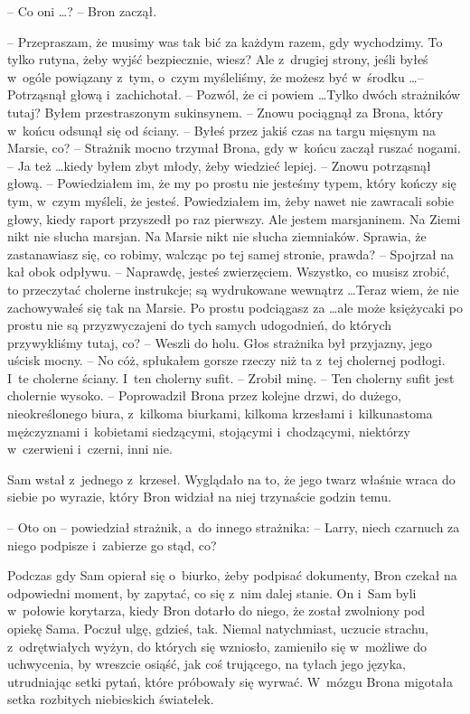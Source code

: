 \documentclass[oneside,polish,11pt,rmheadings]{mwbk}
\begin{document}
-- Co oni \ldots ? -- Bron zaczął. 

-- Przepraszam, że musimy was tak bić za każdym razem, gdy wychodzimy. To tylko rutyna, żeby wyjść bezpiecznie, wiesz? Ale z~drugiej strony, jeśli byłeś w~ogóle powiązany z~tym, o~czym myśleliśmy, że możesz być w~środku \ldots  -- Potrząsnął głową i~zachichotał. -- Pozwól, że ci powiem  \ldots  Tylko dwóch strażników tutaj? Byłem przestraszonym sukinsynem. -- Znowu pociągnął za Brona, który w~końcu odsunął się od ściany. -- Byłeś przez jakiś czas na targu mięsnym na Marsie, co? -- Strażnik mocno trzymał Brona, gdy w~końcu zaczął ruszać nogami. -- Ja też \ldots  kiedy byłem zbyt młody, żeby wiedzieć lepiej. -- Znowu potrząsnął głową. -- Powiedziałem im, że my po prostu nie jesteśmy typem, który kończy się tym, w~czym myśleli, że jesteś. Powiedziałem im, żeby nawet nie zawracali sobie głowy, kiedy raport przyszedł po raz pierwszy. Ale jestem marsjaninem. Na Ziemi nikt nie słucha marsjan. Na Marsie nikt nie słucha ziemniaków. Sprawia, że zastanawiasz się, co robimy, walcząc po tej samej stronie, prawda? -- Spojrzał na kał obok odpływu. -- Naprawdę, jesteś zwierzęciem. Wszystko, co musisz zrobić, to przeczytać cholerne instrukcje; są wydrukowane wewnątrz \ldots  Teraz wiem, że nie zachowywałeś się tak na Marsie. Po prostu podciągasz za \ldots  ale może księżycaki po prostu nie są przyzwyczajeni do tych samych udogodnień, do których przywykliśmy tutaj, co? -- Weszli do holu. Głos strażnika był przyjazny, jego uścisk mocny. -- No cóż, spłukałem gorsze rzeczy niż ta z~tej cholernej podłogi. I~te cholerne ściany. I~ten cholerny sufit. -- Zrobił minę. -- Ten cholerny sufit jest cholernie wysoko. -- Poprowadził Brona przez kolejne drzwi, do dużego, nieokreślonego biura, z~kilkoma biurkami, kilkoma krzesłami i~kilkunastoma mężczyznami i~kobietami siedzącymi, stojącymi i~chodzącymi, niektórzy w~czerwieni i~czerni, inni nie. 

Sam wstał z~jednego z~krzeseł. Wyglądało na to, że jego twarz właśnie wraca do siebie po wyrazie, który Bron widział na niej trzynaście godzin temu. 

-- Oto on -- powiedział strażnik, a~do innego strażnika: -- Larry, niech czarnuch za niego podpisze i~zabierze go stąd, co? 

Podczas gdy Sam opierał się o~biurko, żeby podpisać dokumenty, Bron czekał na odpowiedni moment, by zapytać, co się z~nim dalej stanie. On i~Sam byli w~połowie korytarza, kiedy Bron dotarło do niego, że został zwolniony pod opiekę Sama. Poczuł ulgę,  gdzieś, tak. Niemal natychmiast, uczucie strachu, z~odrętwiałych wyżyn, do których się wzniosło, zamieniło się w~możliwe do uchwycenia, by wreszcie osiąść, jak coś trującego, na tyłach jego języka, utrudniając setki pytań, które próbowały się wyrwać. W~mózgu Brona migotała setka rozbitych niebieskich światełek. 
\end{document}
